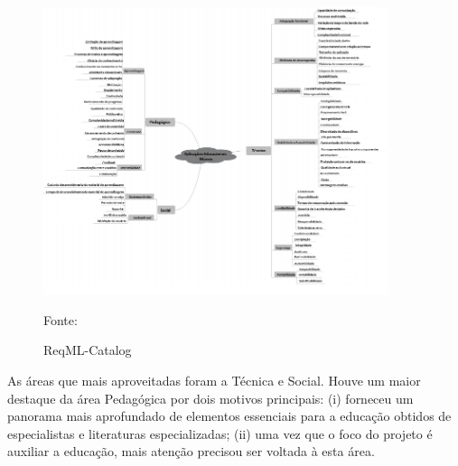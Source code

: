 \begin{figure}[H]
\centering
    \caption{ReqML-Catalog}
    \label{fig:reqML}
    \includegraphics[width=0.9\textwidth]{Figuras/reqML-catalog.png}
    
    Fonte: \cite{soad2017reqml}
\end{figure}

As áreas que mais aproveitadas foram a Técnica e Social. Houve um maior destaque da área Pedagógica por dois motivos principais: (i) forneceu um panorama mais aprofundado de elementos essenciais para a educação obtidos de especialistas e literaturas especializadas; (ii) uma vez que o foco do projeto é auxiliar a educação, mais atenção precisou ser voltada à esta área.

